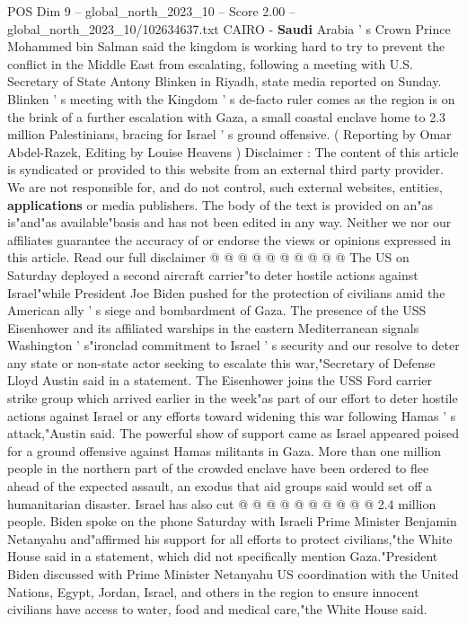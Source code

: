 \begin{textsample}{POS Dim 9 – global\_north\_2023\_10 – Score 2.00 – global\_north\_2023\_10/102634637.txt}  \label{ex:f9_pos_407}
CAIRO - \textbf{Saudi} Arabia ' s Crown Prince Mohammed bin Salman said the kingdom is working hard to try to prevent the conflict in the Middle East from escalating, following a meeting with U.S.
Secretary of State Antony Blinken in Riyadh, state media reported on Sunday.
Blinken ' s meeting with the Kingdom ' s de-facto ruler comes as the region is on the brink of a further escalation with Gaza, a small coastal enclave home to 2.3 million Palestinians, bracing for Israel ' s ground offensive. ( Reporting by Omar Abdel-Razek, Editing by Louise Heavens ) Disclaimer : The content of this article is syndicated or provided to this website from an external third party provider.
We are not responsible for, and do not control, such external websites, entities, \textbf{applications} or media publishers.
The body of the text is provided on an"as is"and"as available"basis and has not been edited in any way.
Neither we nor our affiliates guarantee the accuracy of or endorse the views or opinions expressed in this article.
Read our full disclaimer @ @ @ @ @ @ @ @ @ @ The US on Saturday deployed a second aircraft carrier"to deter hostile actions against Israel"while President Joe Biden pushed for the protection of civilians amid the American ally ' s siege and bombardment of Gaza.
The presence of the USS Eisenhower and its affiliated warships in the eastern Mediterranean signals Washington ' s"ironclad commitment to Israel ' s security and our resolve to deter any state or non-state actor seeking to escalate this war,"Secretary of Defense Lloyd Austin said in a statement.
The Eisenhower joins the USS Ford carrier strike group which arrived earlier in the week"as part of our effort to deter hostile actions against Israel or any efforts toward widening this war following Hamas ' s attack,"Austin said.
The powerful show of support came as Israel appeared poised for a ground offensive against Hamas militants in Gaza.
More than one million people in the northern part of the crowded enclave have been ordered to flee ahead of the expected assault, an exodus that aid groups said would set off a humanitarian disaster.
Israel has also cut @ @ @ @ @ @ @ @ @ @ 2.4 million people.
Biden spoke on the phone Saturday with Israeli Prime Minister Benjamin Netanyahu and"affirmed his support for all efforts to protect civilians,"the White House said in a statement, which did not specifically mention Gaza."President Biden discussed with Prime Minister Netanyahu US coordination with the United Nations, Egypt, Jordan, Israel, and others in the region to ensure innocent civilians have access to water, food and medical care,"the White House said.

\end{textsample}
